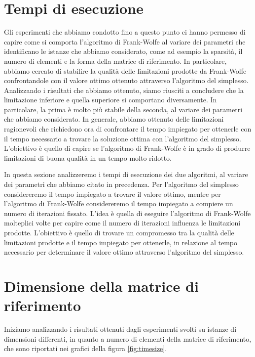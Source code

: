 \section{Tempi di esecuzione}
Gli esperimenti che abbiamo condotto fino a questo punto ci hanno permesso di capire come si comporta l'algoritmo di
Frank-Wolfe al variare dei parametri che identificano le istanze che abbiamo considerato, come ad esempio la sparsità,
il numero di elementi e la forma della matrice di riferimento. In particolare, abbiamo cercato di stabilire la qualità
delle limitazioni prodotte da Frank-Wolfe confrontandole con il valore ottimo ottenuto attraverso l'algoritmo del
simplesso. Analizzando i risultati che abbiamo ottenuto, siamo riusciti a concludere che la limitazione inferiore e
quella superiore si comportano diversamente. In particolare, la prima è molto più stabile della seconda, al variare dei
parametri che abbiamo considerato. In generale, abbiamo ottenuto delle limitazioni ragionevoli che richiedono ora di
confrontare il tempo impiegato per ottenerle con il tempo necessario a trovare la soluzione ottima con l'algoritmo del
simplesso. L'obiettivo è quello di capire se l'algoritmo di Frank-Wolfe è in grado di produrre limitazioni di buona
qualità in un tempo molto ridotto.

In questa sezione analizzeremo i tempi di esecuzione dei due algoritmi, al variare dei parametri che abbiamo
citato in precedenza. Per l'algoritmo del simplesso considereremo il tempo impiegato a trovare il valore ottimo, mentre
per l'algoritmo di Frank-Wolfe considereremo il tempo impiegato a compiere un numero di iterazioni fissato. L'idea è
quella di eseguire l'algoritmo di Frank-Wolfe molteplici volte per capire come il numero di iterazioni influenza le
limitazioni prodotte. L'obiettivo è quello di trovare un compromesso tra la qualità delle limitazioni prodotte e il
tempo impiegato per ottenerle, in relazione al tempo necessario per determinare il valore ottimo attraverso l'algoritmo
del simplesso.

\section{Dimensione della matrice di riferimento}
Iniziamo analizzando i risultati ottenuti dagli esperimenti svolti su istanze di dimensioni
differenti, in quanto a numero di elementi della matrice di riferimento, che sono riportati nei grafici della figura
\ref{fig:timesize}.

